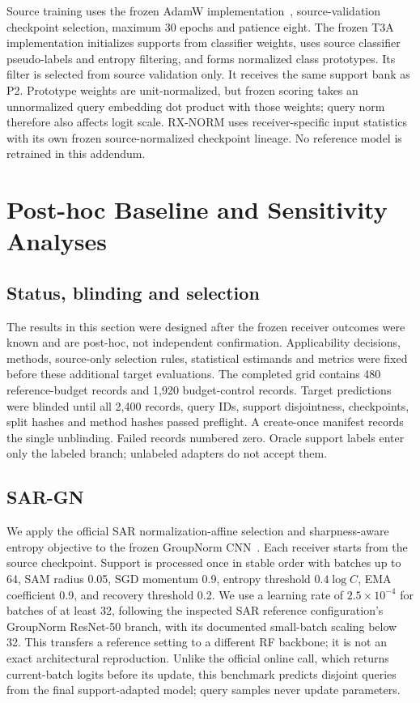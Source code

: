 Source training uses the frozen AdamW implementation~\cite{adamw}, source-validation checkpoint selection, maximum 30 epochs and patience eight. The frozen T3A implementation initializes supports from classifier weights, uses source classifier pseudo-labels and entropy filtering, and forms normalized class prototypes. Its filter is selected from source validation only. It receives the same support bank as P2. Prototype weights are unit-normalized, but frozen scoring takes an unnormalized query embedding dot product with those weights; query norm therefore also affects logit scale. RX-NORM uses receiver-specific input statistics with its own frozen source-normalized checkpoint lineage. No reference model is retrained in this addendum.

\section{Post-hoc Baseline and Sensitivity Analyses}
\subsection{Status, blinding and selection}
The results in this section were designed after the frozen receiver outcomes were known and are post-hoc, not independent confirmation. Applicability decisions, methods, source-only selection rules, statistical estimands and metrics were fixed before these additional target evaluations. The completed grid contains 480 reference-budget records and 1,920 budget-control records. Target predictions were blinded until all 2,400 records, query IDs, support disjointness, checkpoints, split hashes and method hashes passed preflight. A create-once manifest records the single unblinding. Failed records numbered zero. Oracle support labels enter only the labeled branch; unlabeled adapters do not accept them.

\subsection{SAR-GN}
We apply the official SAR normalization-affine selection and sharpness-aware entropy objective to the frozen GroupNorm CNN~\cite{sar}. Each receiver starts from the source checkpoint. Support is processed once in stable order with batches up to 64, SAM radius 0.05, SGD momentum 0.9, entropy threshold $0.4\log C$, EMA coefficient 0.9, and recovery threshold 0.2. We use a learning rate of $2.5\times10^{-4}$ for batches of at least 32, following the inspected SAR reference configuration's GroupNorm ResNet-50 branch, with its documented small-batch scaling below 32. This transfers a reference setting to a different RF backbone; it is not an exact architectural reproduction. Unlike the official online call, which returns current-batch logits before its update, this benchmark predicts disjoint queries from the final support-adapted model; query samples never update parameters.

